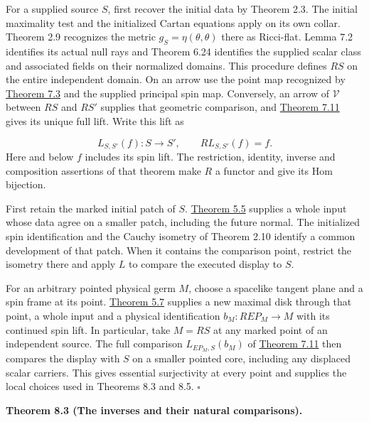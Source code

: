 \documentclass[
  english,
  11pt,
  reqno]{amsart}
\makeatletter
\newcommand{\pandocstatementheading}[1]{%
  \par\addpenalty{\@beginparpenalty}%
  \addvspace{.5\baselineskip plus .2\baselineskip minus .2\baselineskip}%
  {\normalfont\bfseries #1\par}%
  \nobreak\@afterindenttrue\@afterheading
}
\makeatother
\begin{document}
For a supplied source \(S\), first recover the initial data by Theorem
2.3. The initial maximality test and the initialized Cartan equations
apply on its own collar. Theorem 2.9 recognizes the metric
\(g_S=\eta(\theta,\theta)\) there as Ricci-flat. Lemma 7.2 identifies
its actual null rays and Theorem 6.24 identifies the supplied scalar
class and associated fields on their normalized domains. This procedure
defines \(R S\) on the entire independent domain. On an arrow use the
point map recognized by
\hyperref[thm:online-incidence-physical-recognition]{Theorem 7.3} and
the supplied principal spin map. Conversely, an arrow of \(\mathcal V\)
between \(R S\) and \(R S'\) supplies that geometric comparison, and
\hyperref[thm:online-full-unmarked-source-hom]{Theorem 7.11} gives its
unique full lift. Write this lift as

\label{eq:local-unique-physical-lift} \[
L_{S,S'}(f):S\longrightarrow S',\qquad R L_{S,S'}(f)=f .
\] Here and below \(f\) includes its spin lift. The restriction,
identity, inverse and composition assertions of that theorem make \(R\)
a functor and give its Hom bijection.

First retain the marked initial patch of \(S\).
\hyperref[thm:submission-marked-initial-coverage]{Theorem 5.5} supplies
a whole input whose data agree on a smaller patch, including the future
normal. The initialized spin identification and the Cauchy isometry of
Theorem 2.10 identify a common development of that patch. When it
contains the comparison point, restrict the isometry there and apply
\(L\) to compare the executed display to \(S\).

For an arbitrary pointed physical germ \(M\), choose a spacelike tangent
plane and a spin frame at its point.
\hyperref[thm:submission-vacuum-germ-coverage]{Theorem 5.7} supplies a
new maximal disk through that point, a whole input and a physical
identification \(b_M:R E P_M\to M\) with its continued spin lift. In
particular, take \(M=RS\) at any marked point of an independent source.
The full comparison \(L_{E P_M,S}(b_M)\) of
\hyperref[thm:online-full-unmarked-source-hom]{Theorem 7.11} then
compares the display with \(S\) on a smaller pointed core, including any
displaced scalar carriers. This gives essential surjectivity at every
point and supplies the local choices used in Theorems 8.3 and 8.5.
\hfill\(\square\)

\pandocstatementheading{\leavevmode{}\label{thm:local-two-inverses}Theorem 8.3 (The inverses and their natural comparisons).}
\end{document}
